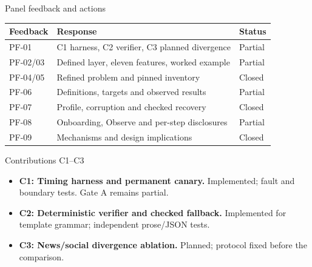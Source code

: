 \documentclass[aspectratio=169,12pt]{beamer}
\begin{document}
\begin{frame}{Panel feedback and actions}


\small\begin{tabular}{@{}p{}p{}p{}@{}}\toprule Feedback & Response & Status\\\midrule
PF-01 & C1 harness, C2 verifier, C3 planned divergence & Partial\\[.8mm]
PF-02/03 & Defined layer, eleven features, worked example & Partial\\[.8mm]
PF-04/05 & Refined problem and pinned inventory & Closed\\[.8mm]
PF-06 & Definitions, targets and observed results & Partial\\[.8mm]
PF-07 & Profile, corruption and checked recovery & Closed\\[.8mm]
PF-08 & Onboarding, Observe and per-step disclosures & Partial\\[.8mm]
PF-09 & Mechanisms and design implications & Closed\\\bottomrule\end{tabular}
\vspace{1.5mm}{\footnotesize Status describes the technical response; remaining evaluation stays in the plan.}



\end{frame}

\begin{frame}{Contributions C1--C3}


\begin{itemize}\setlength{\itemsep}{4mm}
\item \textbf{C1: Timing harness and permanent canary.} Implemented; fault and boundary tests. Gate A remains partial.
\item \textbf{C2: Deterministic verifier and checked fallback.} Implemented for template grammar; independent prose/JSON tests.
\item \textbf{C3: News/social divergence ablation.} Planned; protocol fixed before the comparison.
\end{itemize}
\vspace{3mm}{\small No novelty claim in sentiment, XGBoost, SHAP-to-text or QLoRA. No profit claim.}



\end{frame}
\end{document}

